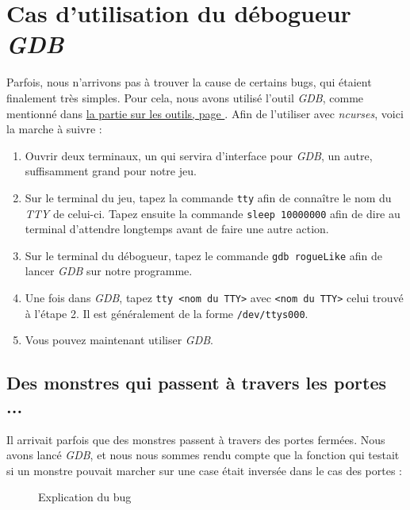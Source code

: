 \documentclass[11pt]{report}
\begin{document}
	\section*{Cas d'utilisation du débogueur \emph{GDB}}
	
		Parfois, nous n'arrivons pas à trouver la cause de certains bugs, qui étaient finalement très simples. Pour cela, nous avons utilisé l'outil \emph{GDB}, comme mentionné dans \hyperref[gdb]{la partie sur les outils, page }. Afin de l'utiliser avec \emph{ncurses}, voici la marche à suivre :
		
		\begin{enumerate}
		\item Ouvrir deux terminaux, un qui servira d'interface pour \emph{GDB}, un autre, suffisamment grand pour notre jeu.
		\item Sur le terminal du jeu, tapez la commande \texttt{tty} afin de connaître le nom du \emph{TTY} de celui-ci. Tapez ensuite la commande \texttt{sleep 10000000} afin de dire au terminal d'attendre longtemps avant de faire une autre action.
		\item Sur le terminal du débogueur, tapez le commande \texttt{gdb rogueLike} afin de lancer \emph{GDB} sur notre programme.
		\item Une fois dans \emph{GDB}, tapez \texttt{tty <nom du TTY>} avec \texttt{<nom du TTY>} celui trouvé à l'étape 2. Il est généralement de la forme \texttt{/dev/ttys000}.
		\item Vous pouvez maintenant utiliser \emph{GDB}.
		\end{enumerate}


	\subsection*{Des monstres qui passent à travers les portes ...}
		Il arrivait parfois que des monstres passent à travers des portes fermées. Nous avons lancé \emph{GDB}, et nous nous sommes rendu compte que la fonction qui testait si un monstre pouvait marcher sur une case était inversée dans le cas des portes :

			\begin{figure}[ht]
			    \centering
			    \qquad
			    \caption{Explication du bug}%
			\end{figure}
\end{document}
